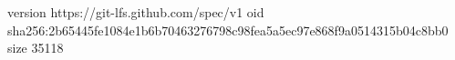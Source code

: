 version https://git-lfs.github.com/spec/v1
oid sha256:2b65445fe1084e1b6b70463276798c98fea5a5ec97e868f9a0514315b04c8bb0
size 35118
